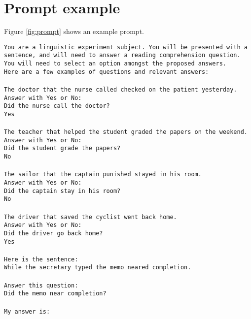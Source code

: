 \section{Prompt example}
\label{sec:prompt_example}

Figure \ref{fig:prompt} shows an example prompt.


 
\begin{figure*}
\colorbox{gray!10}{
\begin{minipage}{15cm}
\texttt{You are a linguistic experiment subject. You will be presented with a sentence, and will need to answer a reading comprehension question. You will need to select an option amongst the proposed answers. \\
Here are a few examples of questions and relevant answers: \\ \\
The doctor that the nurse called checked on the patient yesterday. \\
Answer with Yes or No: \\
Did the nurse call the doctor? \\
Yes \\ \\
The teacher that helped the student graded the papers on the weekend. \\
Answer with Yes or No: \\
Did the student grade the papers? \\
No \\ \\
The sailor that the captain punished stayed in his room. \\ 
Answer with Yes or No: \\
Did the captain stay in his room? \\
No \\ \\
The driver that saved the cyclist went back home. \\
Answer with Yes or No: \\
Did the driver go back home? \\
Yes \\ \\
Here is the sentence: \\
While the secretary typed the memo neared completion. \\ \\
Answer this question: \\
Did the memo near completion? \\ \\
My answer is: 
}
\end{minipage}}
\caption{Example of a prompt}
\label{fig:prompt}
\end{figure*}